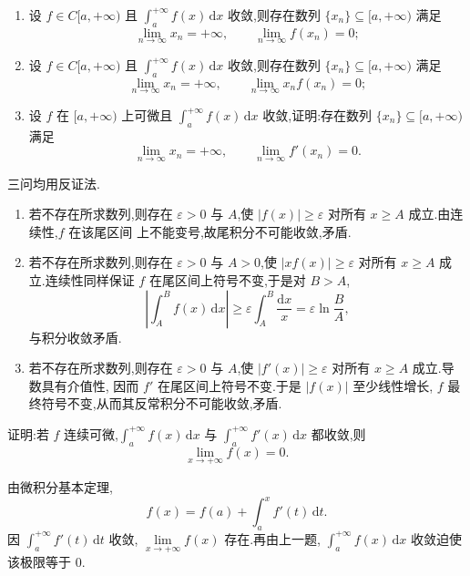 \begin{example}
  \begin{enumerate}
    \item 设 $f\in C\lbrack a,+\infty)$ 且 $\displaystyle\int_a^{+\infty}f(x)\,\mathrm{d}x$ 收敛,则存在数列 $\{x_n\}\subseteq\lbrack a,+\infty)$ 满足
          \[
            \lim\limits_{n\to\infty}x_n=+\infty,
            \qquad
            \lim\limits_{n\to\infty}f(x_n)=0;
          \]
    \item 设 $f\in C\lbrack a,+\infty)$ 且 $\displaystyle\int_a^{+\infty}f(x)\,\mathrm{d}x$ 收敛,则存在数列 $\{x_n\}\subseteq\lbrack a,+\infty)$ 满足
          \[
            \lim\limits_{n\to\infty}x_n=+\infty,
            \qquad
            \lim\limits_{n\to\infty}x_nf(x_n)=0;
          \]
    \item 设 $f$ 在 $\lbrack a,+\infty)$ 上可微且 $\displaystyle\int_a^{+\infty}f(x)\,\mathrm{d}x$ 收敛,证明:存在数列 $\{x_n\}\subseteq\lbrack a,+\infty)$ 满足
          \[
            \lim\limits_{n\to\infty}x_n=+\infty,
            \qquad
            \lim\limits_{n\to\infty}f'(x_n)=0.
          \]
  \end{enumerate}
\end{example}
\exampleblank

\begin{solution}
  三问均用反证法.
  \begin{enumerate}
    \item 若不存在所求数列,则存在 $\varepsilon>0$ 与 $A$,使
          $|f(x)|\geq\varepsilon$ 对所有 $x\geq A$ 成立.由连续性,$f$ 在该尾区间
          上不能变号,故尾积分不可能收敛,矛盾.

    \item 若不存在所求数列,则存在 $\varepsilon>0$ 与 $A>0$,使
          $|xf(x)|\geq\varepsilon$ 对所有 $x\geq A$ 成立.连续性同样保证 $f$
          在尾区间上符号不变,于是对 $B>A$,
          \[
            \left|\int_A^Bf(x)\,\mathrm{d}x\right|
            \geq\varepsilon\int_A^B\dfrac{\mathrm{d}x}{x}
            =\varepsilon\ln\dfrac{B}{A},
          \]
          与积分收敛矛盾.

    \item 若不存在所求数列,则存在 $\varepsilon>0$ 与 $A$,使
          $|f'(x)|\geq\varepsilon$ 对所有 $x\geq A$ 成立.导数具有介值性,
          因而 $f'$ 在尾区间上符号不变.于是 $|f(x)|$ 至少线性增长,
          $f$ 最终符号不变,从而其反常积分不可能收敛,矛盾.
  \end{enumerate}
\end{solution}

\begin{example}
  证明:若 $f$ 连续可微,$\displaystyle\int_a^{+\infty}f(x)\,\mathrm{d}x$ 与 $\displaystyle\int_a^{+\infty}f'(x)\,\mathrm{d}x$ 都收敛,则
  \[
    \lim\limits_{x\to+\infty}f(x)=0.
  \]
\end{example}
\exampleblank

\begin{solution}
  由微积分基本定理,
  \[
    f(x)=f(a)+\int_a^xf'(t)\,\mathrm{d}t.
  \]
  因 $\displaystyle\int_a^{+\infty}f'(t)\,\mathrm{d}t$ 收敛,
  $\displaystyle\lim\limits_{x\to+\infty}f(x)$ 存在.再由上一题,
  $\displaystyle\int_a^{+\infty}f(x)\,\mathrm{d}x$ 收敛迫使该极限等于 $0$.
\end{solution}
